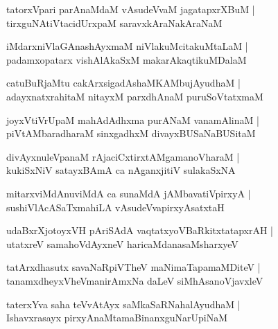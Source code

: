 \documentclass[twoside,12pt,openright]{book}
\newcounter{shloka}[chapter]
\begin{document}
\begin{shloka}%
tatorxVpari parAnaMdaM vAsudeVvaM jagatapxrXBuM |\\
tirxguNAtiVtacidUrxpaM saravxkAraNakAraNaM 
\end{shloka}

\begin{shloka}%
iMdarxniVlaGAnashAyxmaM niVlakuMcitakuMtaLaM |\\
padamxopatarx vishAlAkaSxM makarAkaqtikuMDalaM 
\end{shloka}

\begin{shloka}%
catuBuRjaMtu cakArxsigadAshaMKAMbujAyudhaM |\\
adayxnatxrahitaM nitayxM parxdhAnaM puruSoVtatxmaM
\end{shloka}

\begin{shloka}%
joyxVtiVrUpaM mahAdAdhxma purANaM vanamAlinaM |\\
piVtAMbaradharaM sinxgadhxM divayxBUSaNaBUSitaM 
\end{shloka}

\begin{shloka}%
divAyxnuleVpanaM rAjaciCxtirxtAMgamanoVharaM |\\
kukiSxNiV satayxBAmA ca nAganxjitiV sulakaSxNA
\end{shloka}

\begin{shloka}%
mitarxviMdAnuviMdA ca sunaMdA jAMbavatiVpirxyA |\\
sushiVlAcASaTxmahiLA vAsudeVvapirxyAsatxtaH 
\end{shloka}

\begin{shloka}%
udaBxrXjotoyxVH pAriSAdA vaqtatxyoVBaRkitxtatapxrAH |\\
utatxreV samahoVdAyxneV haricaMdanasaMsharxyeV 
\end{shloka}

\begin{shloka}%
tatArxdhasutx savaNaRpiVTheV maNimaTapamaMDiteV |\\
tanamxdheyxVheVmanirAmxNa daLeV siMhAsanoVjavxleV 
\end{shloka}

\begin{shloka}%
taterxYva saha teVvAtAyx saMkaSaRNahalAyudhaM |\\
Ishavxrasayx pirxyAnaMtamaBinanxguNarUpiNaM 
\end{shloka}
\end{document}

